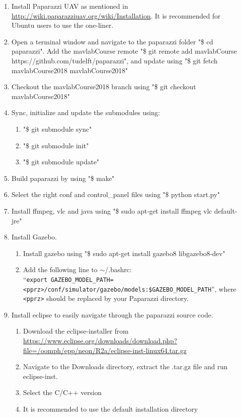 \documentclass{article}
\begin{document}
\begin{enumerate}
\item{Install Paparazzi UAV as mentioned in \url{http://wiki.paparazziuav.org/wiki/Installation}. It is recommended for Ubuntu users to use the one-liner.}
\item{Open a terminal window and navigate to the paparazzi folder "\$ cd paparazzi". Add the mavlabCourse remote "\$ git remote add mavlabCourse https://github.com/tudelft/paparazzi", and update using "\$ git fetch mavlabCourse2018 mavlabCourse2018"}
\item{Checkout the mavlabCourse2018 branch using "\$ git checkout mavlabCourse2018"}
\item{Sync, initialize and update the submodules using:
\begin{enumerate}
\item{"\$ git submodule sync"}
\item{"\$ git submodule init"}
\item{"\$ git submodule update"}
\end{enumerate}
}
\item{Build paparazzi by using "\$ make"}
\item{Select the right conf and control\_panel files using "\$ python start.py"}
\item{Install ffmpeg, vlc and java using "\$ sudo apt-get install ffmpeg vlc default-jre"}
\item{Install Gazebo.
\begin{enumerate}
\item{Install gazebo using "\$ sudo apt-get install gazebo8 libgazebo8-dev"}
\item{Add the following line to $\sim$/.bashrc:\\
``\verb"export GAZEBO_MODEL_PATH=<pprz>/conf/simulator/gazebo/models:$GAZEBO_MODEL_PATH"'', where \verb"<pprz>" should be replaced by your Paparazzi directory.}
\end{enumerate}}
\item{Install eclipse to easily navigate through the paparazzi source code.
\begin{enumerate}
\item{Download the eclipse-installer from \url{https://www.eclipse.org/downloads/download.php?file=/oomph/epp/neon/R2a/eclipse-inst-linux64.tar.gz}}
\item{Navigate to the Downloads directory, extract the .tar.gz file and run eclipse-inst.}
\item{Select the C/C++ version}
\item{It is recommended to use the default installation directory}

\end{enumerate}}
\end{enumerate}
\end{document}
